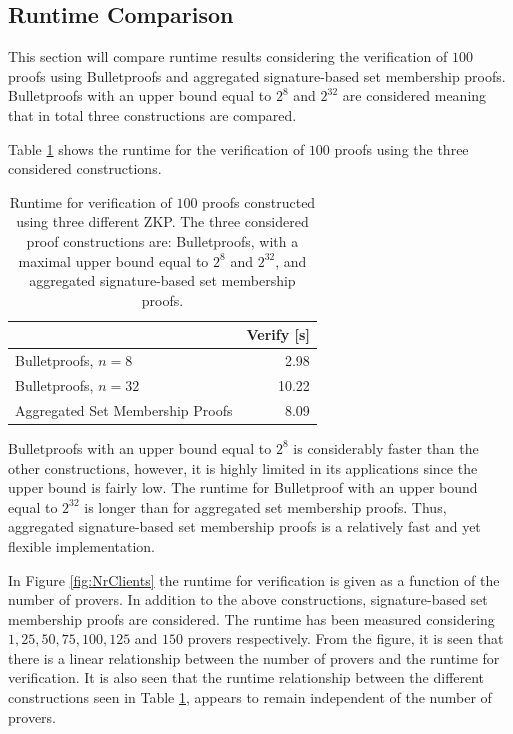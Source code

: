 
\subsection*{Runtime Comparison}
This section will compare runtime results considering the verification of $100$ proofs using Bulletproofs and aggregated signature-based set membership proofs.  Bulletproofs with an upper bound equal to $2^8$ and $2^{32}$ are considered meaning that in total three constructions are compared.

Table \ref{tab:CompareToBulletproof} shows the runtime for the verification of $100$ proofs using the three considered constructions.

\begin{table}
\centering
\begin{tabular}{l | r }
\toprule
	  											& \textbf{Verify} [s]\\	\midrule
  Bulletproofs, $n=8$					&   2.98 		\\ 
  Bulletproofs, $n=32$					&   10.22 		\\ 
  Aggregated Set Membership Proofs 	&   8.09 	 \\ 
  \bottomrule 
\end{tabular}
\caption{Runtime for verification of $100$ proofs constructed using three different ZKP. The three considered proof constructions are: Bulletproofs, with a maximal upper bound equal to $2^8$ and $2^{32}$, and aggregated signature-based set membership proofs. }
\label{tab:CompareToBulletproof}
\end{table}

Bulletproofs with an upper bound equal to $2^8$ is considerably faster than the other constructions, however, it is highly limited in its applications since the upper bound is fairly low. The runtime for Bulletproof with an upper bound equal to $2^{32}$ is longer than for aggregated set membership proofs. Thus, aggregated signature-based set membership proofs is a relatively fast and yet flexible implementation. 

In Figure \ref{fig:NrClients} the runtime for verification is given as a function of the number of provers. In addition to the above constructions, signature-based set membership proofs are considered. The runtime has been measured considering  $1,25,50,75,100,125$ and $150$ provers respectively.  From the figure, it is seen that there is a linear relationship between the number of provers and the runtime for verification. It is also seen that the runtime relationship between the different constructions seen in Table \ref{tab:CompareToBulletproof}, appears to remain independent of the number of provers. 

